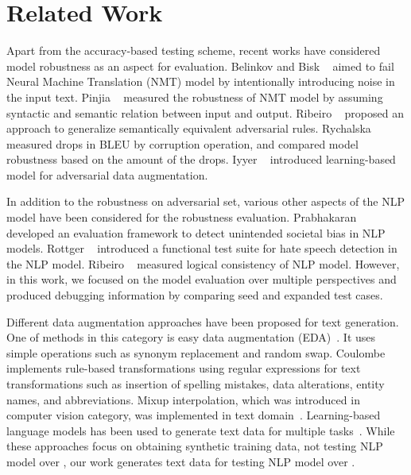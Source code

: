 \vspace{-6pt}
\section{Related Work}

%
Apart from the accuracy-based testing
scheme, recent works have considered model robustness as an
aspect for evaluation. Belinkov and Bisk
\textit{\etal}~\cite{belinkov2018breaknmt} aimed to fail Neural Machine
Translation (NMT) model by intentionally introducing noise in the input
text. Pinjia
\textit{\etal}~\cite{pinjia2020structinvtestingnmt,pinjia2020testnmtrt}
measured the robustness of NMT model by assuming syntactic and semantic relation between input and output. Ribeiro
\textit{\etal}~\cite{ribeiro2018sear} proposed an approach to
generalize semantically equivalent adversarial rules. Rychalska \textit{\etal}~\cite{rychalska2019wildnlp} measured drops in
BLEU by corruption operation, and compared model robustness
based on the amount of the drops. Iyyer
\textit{\etal}~\cite{iyyer2018adversarial} introduced learning-based
model for adversarial data augmentation.

In addition to the
robustness on adversarial set, various other aspects of the NLP model have been
considered for the robustness evaluation. Prabhakaran
\textit{\etal}~\cite{prabhakaran2019fairness} developed an evaluation
framework to detect unintended societal bias in NLP models. Rottger
\textit{\etal}~\cite{rottger2020hatecheck} introduced a functional
test suite for hate speech detection in the NLP model.  Ribeiro
\textit{\etal}~\cite{ribeiro2019consistencyeval} measured logical
consistency of NLP model. However, in this work, we focused on the model evaluation over multiple perspectives and produced debugging information by comparing seed and expanded test cases.

%
Different data augmentation approaches have been proposed for text generation. One of methods in this category is easy data augmentation (EDA)~\cite{weizou2019eda}. It uses simple operations such as synonym replacement and random swap. Coulombe~\cite{coulombe2018textaugapi} implements rule-based transformations using regular expressions for text transformations such as insertion of spelling mistakes, data alterations, entity names, and abbreviations. Mixup interpolation, which was introduced in computer vision category, was implemented in text domain~\cite{hongyu2019dataaugmixup}. Learning-based language models has been used to generate text data for multiple tasks~\cite{qizhe2019unsupdataaug, ateret2019lambda}. While these approaches focus on obtaining synthetic training data, not testing NLP model over \lcs,
our work generates text data for testing NLP model over \lcs.


